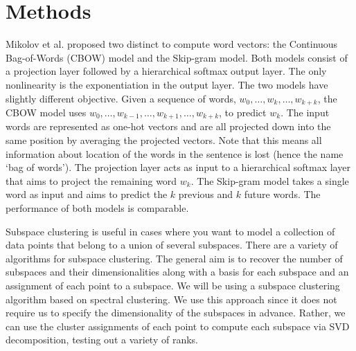 \section{Methods}\label{sec:methods}

Mikolov et al. proposed two distinct to compute word vectors: the Continuous Bag-of-Words (CBOW) model and the Skip-gram model. 
Both models consist of a projection layer followed by a hierarchical softmax output layer. 
The only nonlinearity is the exponentiation in the output layer. 
The two models have slightly different objective. 
Given a sequence of words, $w_0, \hdots , w_k, \hdots, w_{k+k}$, the CBOW model uses $w_0, \hdots, w_{k-1}, \hdots, w_{k+1}, \hdots, w_{k+k}$, to predict $w_k$. 
The input words are represented as one-hot vectors and are all projected down into the same position by averaging the projected vectors. 
Note that this means all information about location of the words in the sentence is lost (hence the name `bag of words'). 
The projection layer acts as input to a hierarchical softmax layer that aims to project the remaining word $w_k$. 
The Skip-gram model takes a single word as input and aims to predict the $k$ previous and $k$ future words. 
The performance of both models is comparable.

Subspace clustering is useful in cases where you want to model a collection of data points that belong to a union of several subspaces.
There are a variety of algorithms for subspace clustering. The general aim is to recover the number of subspaces and their dimensionalities along with a basis for each subspace and an assignment of each point to a subspace. 
We will be using a subspace clustering algorithm based on spectral clustering. We use this approach since it does not require us to specify the dimensionality of the subspaces in advance. Rather, we can use the cluster assignments of each point to compute each subspace via SVD decomposition, testing out a variety of ranks. 
